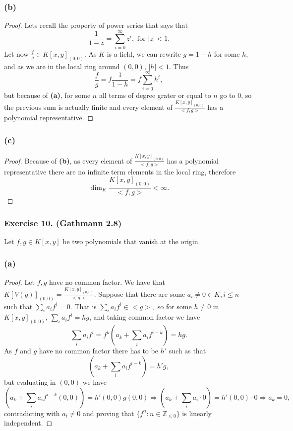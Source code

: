\documentclass[11pt,a4paper]{article}
\begin{document}
\subsubsection*{\bf (b)}
\begin{proof}
  Lets recall the property of power series that says that
$$
  \frac{1}{1-z} = \sum_{i=0}^{\infty} z^i, \text{ for } |z| <1.
$$
Let now $ \frac{f}{g} \in K[x,y]_{(0,0)} $. As $ K $ is a field, we can rewrite $ g = 1 - h $ for some $ h $, and as we are in the local ring around $ (0,0) $, $|h| < 1 $. Thus
$$
\frac{f}{g} = f \frac{1}{1-h} = f \sum_{i=0}^{\infty} h^i,
$$
but because of {\bf (a)}, for some $ n$ all terms of degree grater or equal to $ n $ go to $ 0 $, so the previous sum is actually finite and every element of $\frac{K[x,y]_{(0,0)}}{<f,g>} $ has a polynomial representative.
\end{proof}

\subsubsection*{\bf (c)}
\begin{proof}
  Because of {\bf (b)}, as every element of $\frac{K[x,y]_{(0,0)}}{<f,g>} $ has a polynomial representative there are no infinite term elements in the local ring, therefore
  $$
    \operatorname{dim}_K \frac{K[x,y]_{(0,0)}}{<f,g>} < \infty.
  $$
\end{proof}

\subsubsection*{\bf Exercise 10. (Gathmann 2.8)}
Let $ f, g \in K[x,y] $ be two polynomials that vanish at the origin.

\subsubsection*{\bf (a)}
\begin{proof}
  Let $ f, g $ have no common factor.
  We have that $K[V(g)]_{(0,0)} = \frac{K[x,y]_{(0,0)}}{<g>} $.
  Suppose that there are some $ a_i \neq 0 \in K, i \leq n $ such that
  $
    \sum_i a_i f^i = 0.
  $
  That is
  $
    \sum_i a_i f^i \in <g>,
  $ so for some $ h \neq 0 $ in $ K[x,y]_{(0,0)} $,
  $
    \sum_i a_i f^i = hg
  $, and taking common factor we have
  $$
    \sum_i a_i f^i = f^k (a_k + \sum_i a_i f^{i-k}) = hg.
  $$
  As $ f $ and $ g $ have no common factor there has to be $ h' $ such as that
  $$
    (a_k + \sum_i a_i f^{i-k}) = h'g,
  $$
  but evaluating in $ (0, 0) $ we have
  $$
    (a_k + \sum_i a_i f^{i-k}(0, 0)) = h'(0,0) g(0,0) \Rightarrow (a_k + \sum_i a_i \cdot 0) = h'(0,0) \cdot 0 \Rightarrow a_k = 0,
  $$
  contradicting with $ a_i \neq 0 $ and proving that $\{ f^n: n \in \mathbb Z_{\leq 0}\}$ is linearly independent.
\end{proof}
\end{document}
